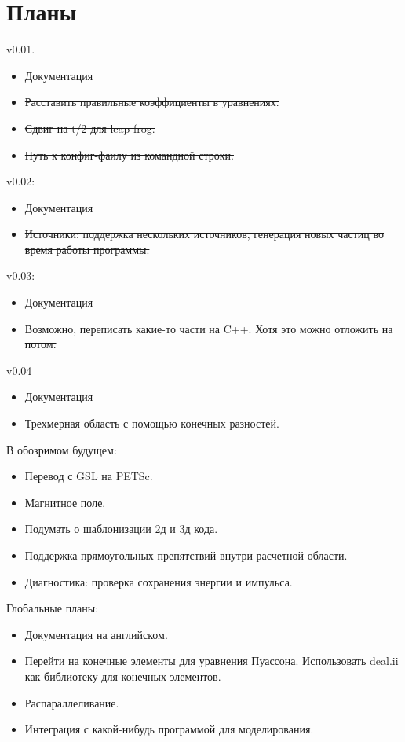 \section{ Планы }
v0.01.
\begin{itemize}
\item Документация
\item \sout{Расставить правильные коэффициенты в уравнениях.}
\item \sout{Сдвиг на t/2 для leap-frog.}
\item \sout{Путь к конфиг-фаилу из командной строки.}
\end{itemize}

v0.02:
\begin{itemize}
\item Документация
\item \sout{Источники: поддержка нескольких источников, генерация новых частиц во время работы программы.}
\end{itemize}

v0.03:
\begin{itemize}
\item Документация
\item \sout{Возможно, переписать какие-то части на C++. Хотя это можно отложить на потом.}
\end{itemize}

v0.04
\begin{itemize}
\item Документация
\item Трехмерная область с помощью конечных разностей.
\end{itemize}

\bigskip \bigskip
В обозримом будущем:
\begin{itemize}
\item Перевод с GSL на PETSc.
\item Магнитное поле.
\item Подумать о шаблонизации 2д и 3д кода.
\item Поддержка прямоугольных препятствий внутри расчетной области.
\item Диагностика: проверка сохранения энергии и импульса.
\end{itemize}

\bigskip \bigskip
Глобальные планы:
\begin{itemize}
\item Документация на английском.
\item Перейти на конечные элементы для уравнения Пуассона.
  Использовать deal.ii как библиотеку для конечных элементов.
\item Распараллеливание.
\item Интеграция с какой-нибудь программой для моделирования.
\end{itemize}


